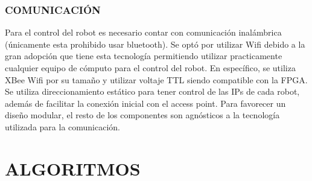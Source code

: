 \documentclass[twocolumn,10pt]{amrob}
\begin{document}
\subsubsection*{COMUNICACIÓN}
Para el control del robot es necesario contar con comunicación inalámbrica (\'unicamente esta prohibido usar bluetooth). Se opt\'o por utilizar Wifi debido a la gran adopci\'on que tiene esta tecnología permitiendo utilizar practicamente cualquier equipo de cómputo para el control del robot. En específico, se utiliza XBee Wifi por su tamaño y utilizar voltaje TTL siendo compatible con la FPGA. Se utiliza direccionamiento estático para tener control de las IPs de cada robot, además de facilitar la conexión inicial con el access point. Para favorecer un diseño modular, el resto de los componentes son agnósticos a la tecnología utilizada para la comunicación. \par %
\section*{ALGORITMOS}
\end{document}
